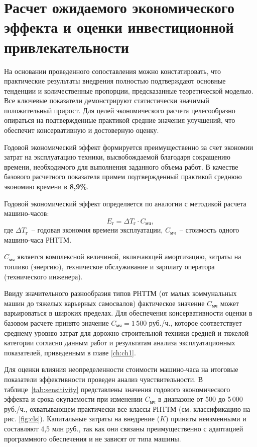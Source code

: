 \section{Расчет ожидаемого экономического эффекта и оценки инвестиционной привлекательности}
\label{sec:ch4/sec2}

На основании проведенного сопоставления можно констатировать, что практические результаты внедрения полностью подтверждают основные тенденции и количественные пропорции, предсказанные теоретической моделью. Все ключевые показатели демонстрируют статистически значимый положительный прирост. Для целей экономического расчета целесообразно опираться на подтвержденные практикой средние значения улучшений, что обеспечит консервативную и достоверную оценку.

Годовой экономический эффект формируется преимущественно за счет экономии затрат на эксплуатацию техники, высвобождаемой благодаря сокращению времени, необходимого для выполнения заданного объема работ. В качестве базового расчетного показателя примем подтвержденный практикой среднюю экономию времени в \textbf{8,9\%}.

Годовой экономический эффект определяется по аналогии с методикой расчета машино-часов:
\begin{equation}
	E_{\text{г}} = \Delta T_{\text{г}} \cdot C_{\text{мч}},
\end{equation}
где $\Delta T_{\text{г}}$~-- годовая экономия времени эксплуатации,
$C_{\text{мч}}$~-- стоимость одного машино-часа РНТТМ.

$ C_{\text{мч}} $ является комплексной величиной, включающей амортизацию, затраты на топливо (энергию), техническое обслуживание и зарплату оператора (технического инженера).

Ввиду значительного разнообразия типов РНТТМ (от малых коммунальных машин до тяжелых карьерных самосвалов) фактическое значение $ C_{\text{мч}} $ может варьироваться в широких пределах. Для обеспечения консервативности оценки в базовом расчете принято значение $ C_{\text{мч}} = 1\,500 $ руб./ч., которое соответствует среднему уровню затрат для дорожно-строительной техники средней и тяжелой категории согласно данным работ \cite{grushezkii_2021, SandanEvtukov} и результатам анализа эксплуатационных показателей, приведенным в главе \ref{ch:ch1}.

Для оценки влияния неопределенности стоимости машино-часа на итоговые показатели эффективности проведен анализ чувствительности. В таблице~\ref{tab:sensitivity} представлены значения годового экономического эффекта и срока окупаемости при изменении $ C_{\text{мч}} $ в диапазоне от 500 до 5\,000 руб./ч., охватывающем практически все классы РНТТМ (см. классификацию на рис. \ref{fig:cls}). Капитальные затраты на внедрение ($ K $) приняты неизменными и составляют 4,5 млн руб., так как они связаны преимущественно с адаптацией программного обеспечения и не зависят от типа машины.

